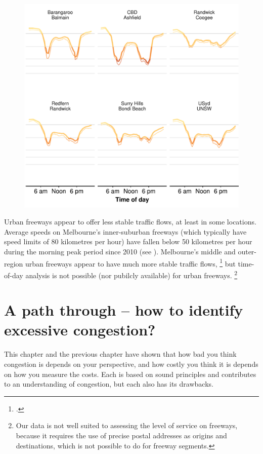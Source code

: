 \begin{figure}
\begin{minipage}[t][\textheight]{\columnwidth}
  \includegraphics{atlas/Avg-LOS-short-routes-SYD-1.pdf}
  \null\vfill\null
\end{minipage}
\end{figure}

Urban freeways appear to offer less stable traffic flows, at least in some locations. Average speeds on Melbourne's inner-suburban freeways (which typically have speed limits of 80 kilometres per hour) have fallen below 50 kilometres per hour during the morning peak period since 2010 (see ). Melbourne's middle and outer-region urban freeways appear to have much more stable traffic flows,%
    \footcite{Vicroads-201415-TravelSpeed-tableau}
but time-of-day analysis is not possible (nor pubilcly available) for urban freeways.%
    \footnote{Our data is not well suited to assessing the level of service on freeways, because it requires the use of precise postal addresses as origins and destinations, which is not possible to do for freeway segments.}



\section{A path through -- how to identify excessive congestion?}\label{tbl:a-path-through}

This chapter and the previous chapter have shown that how bad you think congestion is depends on your perspective, and how costly you think it is depends on how you measure the costs. Each is based on sound principles and contributes to an understanding of congestion, but each also has its drawbacks. 


